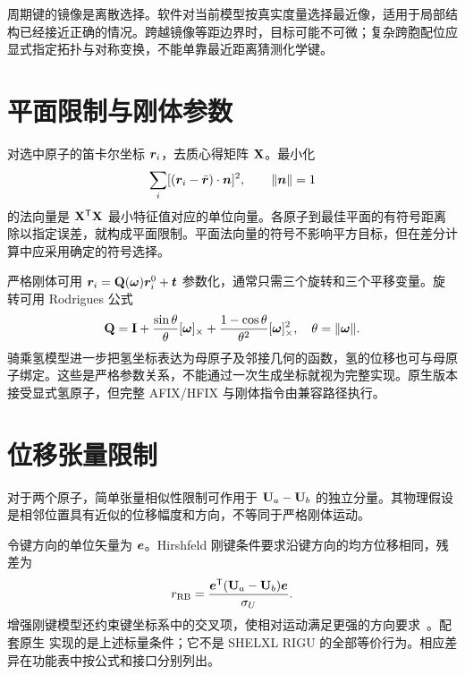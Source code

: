 周期键的镜像是离散选择。软件对当前模型按真实度量选择最近像，适用于局部结构已经接近正确的情况。跨越镜像等距边界时，目标可能不可微；复杂跨胞配位应显式指定拓扑与对称变换，不能单靠最近距离猜测化学键。

\section{平面限制与刚体参数}
对选中原子的笛卡尔坐标 $\bm{r}_i$，去质心得矩阵 $\mathbf{X}$。最小化
\begin{equation}
\sum_i[(\bm{r}_i-\bar{\bm{r}})\cdot\bm{n}]^2,
\qquad \lVert\bm{n}\rVert=1
\end{equation}
的法向量是 $\mathbf{X}^{\mathsf T}\mathbf{X}$ 最小特征值对应的单位向量。各原子到最佳平面的有符号距离除以指定误差，就构成平面限制。平面法向量的符号不影响平方目标，但在差分计算中应采用确定的符号选择。

严格刚体可用 $\bm{r}_i=\mathbf{Q}(\bm{\omega})\bm{r}_i^0+\bm{t}$ 参数化，通常只需三个旋转和三个平移变量。旋转可用 Rodrigues 公式
\begin{equation}
\mathbf{Q}=\mathbf{I}+\frac{\sin\theta}{\theta}[\bm{\omega}]_\times
+\frac{1-\cos\theta}{\theta^2}[\bm{\omega}]_\times^2,
\quad \theta=\lVert\bm{\omega}\rVert.
\end{equation}
骑乘氢模型进一步把氢坐标表达为母原子及邻接几何的函数，氢的位移也可与母原子绑定。这些是严格参数关系，不能通过一次生成坐标就视为完整实现。原生版本接受显式氢原子，但完整 AFIX/HFIX 与刚体指令由兼容路径执行。

\section{位移张量限制}
对于两个原子，简单张量相似性限制可作用于 $\mathbf{U}_a-\mathbf{U}_b$ 的独立分量。其物理假设是相邻位置具有近似的位移幅度和方向，不等同于严格刚体运动。

令键方向的单位矢量为 $\bm{e}$。Hirshfeld 刚键条件要求沿键方向的均方位移相同，残差为
\begin{equation}
r_{\mathrm{RB}}=\frac{\bm{e}^{\mathsf T}(\mathbf{U}_a-\mathbf{U}_b)\bm{e}}{\sigma_U}.
\end{equation}
增强刚键模型还约束键坐标系中的交叉项，使相对运动满足更强的方向要求~\cite{rigu2012}。配套原生  实现的是上述标量条件；它不是 SHELXL RIGU 的全部等价行为。相应差异在功能表中按公式和接口分别列出。

